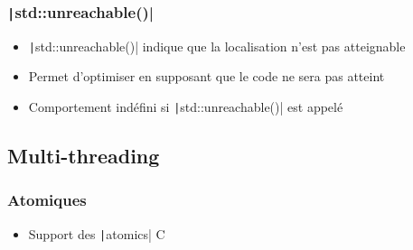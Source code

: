 \documentclass[C++.tex]{subfiles}
\begin{document}
\begin{frame}[fragile]
	\frametitle{\texttt|std::unreachable()|}
	\begin{itemize}
		\item \texttt|std::unreachable()| indique que la localisation n'est pas atteignable
		\item Permet d'optimiser en supposant que le code ne sera pas atteint
		\item Comportement indéfini si \texttt|std::unreachable()| est appelé
	\end{itemize}


\end{frame}

\subsection*{Multi-threading}
\begin{frame}[fragile]
	\frametitle{Atomiques}
	\begin{itemize}
		\item Support des \texttt|atomics| C
	\end{itemize}

\end{frame}
\end{document}

